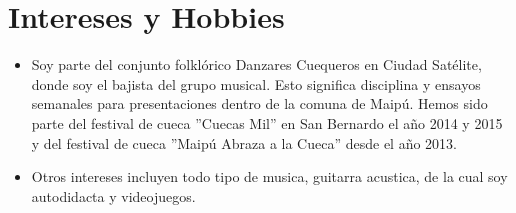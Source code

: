 \documentclass[11pt,a4paper,roman]{moderncv}        %
\begin{document}
\section{Intereses y Hobbies}
\vspace{1pt}


\begin{itemize}

\item{Soy parte del conjunto folklórico Danzares Cuequeros en Ciudad Satélite, donde soy el bajista del grupo musical. Esto significa disciplina y ensayos semanales para presentaciones dentro de la comuna de Maipú. Hemos sido parte del festival de cueca ''Cuecas Mil'' en San Bernardo el año 2014 y 2015 y del festival de cueca ''Maipú Abraza a la Cueca'' desde el año 2013.}

\vspace{3pt}

\item{Otros intereses incluyen todo tipo de musica, guitarra acustica, de la cual soy autodidacta y videojuegos.}
\end{itemize}


\nocite{*}


\end{document}
